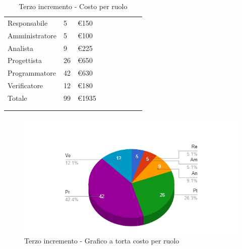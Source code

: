 {{\begin{longtable}{C{.4\freewidth} C{.2\freewidth} C{.2\freewidth} C{.2\freewidth} C{.2\freewidth} C{.2\freewidth} C{.2\freewidth} C{.2\freewidth} C{.2\freewidth}}
        Responsabile  & 5 & €150\\
        Amministratore  & 5 & €100 \\
        Analista &9 & €225\\
        Progettista &26 & €650\\
        Programmatore &42 & €630\\
        Verificatore &12 & €180\\
        Totale&99&€1935\\
        \bottomrule
      \\
        \caption{Terzo incremento - Costo per ruolo}

        \end{longtable}
        \begin{figure}[H]
          \includegraphics[width=15cm]{sezioni/Images/terzoT.png}
          \centering
          \caption{Terzo incremento - Grafico a torta costo per ruolo}
       \end{figure}
    }
    }

